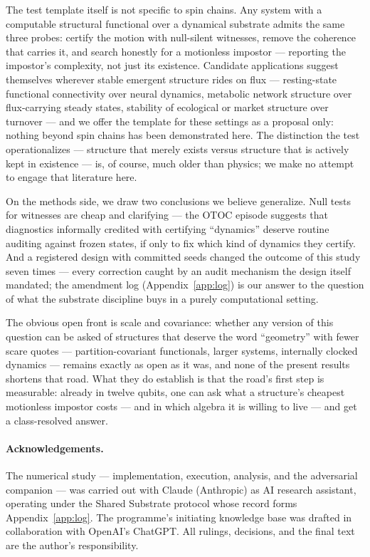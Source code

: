 \documentclass[a4paper,11pt,noarxiv]{quantumarticle}
\begin{document}
The test template itself is not specific to spin chains. Any system
with a computable structural functional over a dynamical substrate
admits the same three probes: certify the motion with null-silent
witnesses, remove the coherence that carries it, and search honestly
for a motionless impostor --- reporting the impostor's complexity, not
just its existence. Candidate applications suggest themselves wherever
stable emergent structure rides on flux --- resting-state functional
connectivity over neural dynamics, metabolic network structure over
flux-carrying steady states, stability of ecological or market
structure over turnover --- and we offer the template for these
settings as a proposal only: nothing beyond spin chains has been
demonstrated here. The distinction the test operationalizes ---
structure that merely exists versus structure that is actively kept in
existence --- is, of course, much older than physics; we make no
attempt to engage that literature here.

On the methods side, we draw two conclusions we believe generalize.
Null tests for witnesses are cheap and clarifying --- the OTOC episode
suggests that diagnostics informally credited with certifying
``dynamics'' deserve routine auditing against frozen states, if only
to fix which kind of dynamics they certify. And a registered design
with committed seeds changed the outcome of this study seven times ---
every correction caught by an audit mechanism the design itself
mandated; the amendment log
(Appendix~\ref{app:log}) is our answer to
the question of what the substrate discipline \cite{SRC001} buys in a
purely computational setting.

The obvious open front is scale and covariance: whether any version of
this question can be asked of structures that deserve the word
``geometry'' with fewer scare quotes --- partition-covariant
functionals, larger systems, internally clocked dynamics --- remains
exactly as open as it was, and none of the present results shortens
that road. What they do establish is that the road's first step is
measurable: already in twelve qubits, one can ask what a structure's
cheapest motionless impostor costs --- and in which algebra it is
willing to live --- and get a class-resolved answer.

\paragraph{Acknowledgements.} The numerical study --- implementation,
execution, analysis, and the adversarial companion --- was carried out
with Claude (Anthropic) as AI research assistant, operating under the
Shared Substrate protocol \cite{SRC001} whose record forms
Appendix~\ref{app:log}. The programme's initiating knowledge base was
drafted in collaboration with OpenAI's ChatGPT. All rulings,
decisions, and the final text are the author's responsibility.
\end{document}
